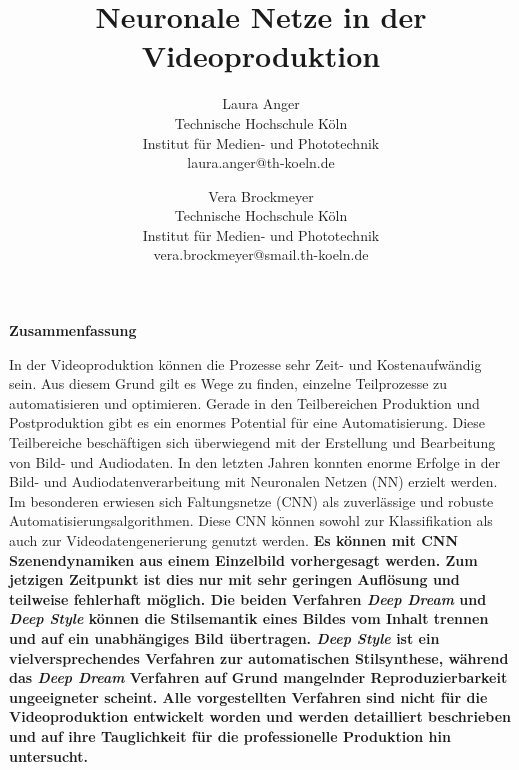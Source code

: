 \documentclass[times, 11pt,twocolumn]{article}
\begin{document}
\title{Neuronale Netze in der Videoproduktion}

\author{Laura Anger\\
Technische Hochschule K\"oln \\ Institut f\"ur Medien- und Phototechnik \\  laura.anger@th-koeln.de \\
\and
Vera Brockmeyer\\
Technische Hochschule K\"oln \\ Institut f\"ur Medien- und Phototechnik \\ vera.brockmeyer@smail.th-koeln.de \\
}

\maketitle
\thispagestyle{empty}


\large{\textbf{Zusammenfassung}}\\ \small %

In der Videoproduktion können die Prozesse sehr Zeit- und Kostenaufwändig sein. Aus diesem Grund gilt es Wege zu finden, einzelne Teilprozesse zu automatisieren und optimieren. Gerade in den Teilbereichen Produktion und Postproduktion gibt es ein enormes Potential für eine Automatisierung. Diese Teilbereiche beschäftigen sich überwiegend mit der Erstellung und Bearbeitung von Bild- und Audiodaten. In den letzten Jahren konnten enorme Erfolge in der Bild- und Audiodatenverarbeitung mit Neuronalen Netzen (NN) erzielt werden. Im besonderen erwiesen sich Faltungsnetze (CNN) als zuverlässige und robuste Automatisierungsalgorithmen. Diese CNN können sowohl zur Klassifikation als auch zur Videodatengenerierung genutzt werden.
\textbf{Es können mit CNN Szenendynamiken aus einem Einzelbild vorhergesagt werden. Zum jetzigen Zeitpunkt ist dies nur mit sehr geringen Auflösung und teilweise fehlerhaft möglich. Die beiden Verfahren \textit{Deep Dream} und \textit{Deep Style} können die Stilsemantik eines Bildes vom Inhalt trennen und auf ein unabhängiges Bild übertragen. \textit{Deep Style} ist ein vielversprechendes Verfahren zur automatischen Stilsynthese, während das \textit{Deep Dream} Verfahren auf Grund mangelnder Reproduzierbarkeit ungeeigneter scheint. Alle vorgestellten Verfahren sind nicht für die Videoproduktion entwickelt worden und werden detailliert beschrieben und auf ihre Tauglichkeit für die professionelle Produktion hin untersucht. }\\
\end{document}
